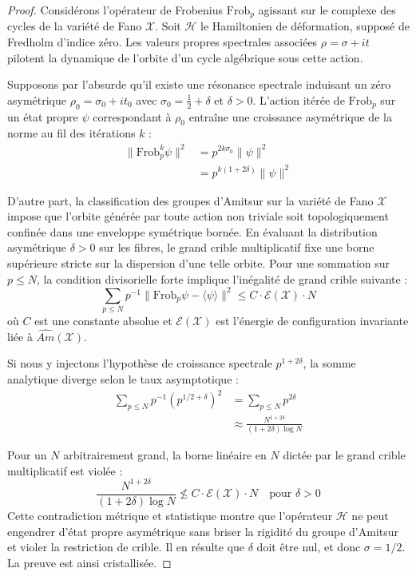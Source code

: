 \documentclass[
]{article}
\begin{document}
\begin{proof}
Considérons l'opérateur de Frobenius $\mathrm{Frob}_p$ agissant sur le complexe des cycles de la variété de Fano $\mathcal{X}$. Soit $\mathcal{H}$ le Hamiltonien de déformation, supposé de Fredholm d'indice zéro. Les valeurs propres spectrales associées $\rho = \sigma + it$ pilotent la dynamique de l'orbite d'un cycle algébrique sous cette action.

Supposons par l'absurde qu'il existe une résonance spectrale induisant un zéro asymétrique $\rho_0 = \sigma_0 + it_0$ avec $\sigma_0 = \frac{1}{2} + \delta$ et $\delta > 0$.
L'action itérée de $\mathrm{Frob}_p$ sur un état propre $\psi$ correspondant à $\rho_0$ entraîne une croissance asymétrique de la norme au fil des itérations $k$ :
\begin{align*}
\|\mathrm{Frob}_p^k \psi\|^2 &= p^{2k\sigma_0} \|\psi\|^2 \\
&= p^{k(1 + 2\delta)} \|\psi\|^2
\end{align*}

D'autre part, la classification des groupes d'Amitsur sur la variété de Fano $\mathcal{X}$ impose que l'orbite générée par toute action non triviale soit topologiquement confinée dans une enveloppe symétrique bornée. En évaluant la distribution asymétrique $\delta > 0$ sur les fibres, le grand crible multiplicatif fixe une borne supérieure stricte sur la dispersion d'une telle orbite. Pour une sommation sur $p \le N$, la condition divisorielle forte implique l'inégalité de grand crible suivante :
\begin{equation*}
\sum_{p \le N} p^{-1} \|\mathrm{Frob}_p \psi - \langle \psi \rangle\|^2 \le C \cdot \mathcal{E}(\mathcal{X}) \cdot N
\end{equation*}
où $C$ est une constante absolue et $\mathcal{E}(\mathcal{X})$ est l'énergie de configuration invariante liée à $\widehat{Am}(\mathcal{X})$.

Si nous y injectons l'hypothèse de croissance spectrale $p^{1+2\delta}$, la somme analytique diverge selon le taux asymptotique :
\begin{align*}
\sum_{p \le N} p^{-1} (p^{1/2 + \delta})^2 &= \sum_{p \le N} p^{2\delta} \\
&\approx \frac{N^{1+2\delta}}{(1+2\delta)\log N}
\end{align*}

Pour un $N$ arbitrairement grand, la borne linéaire en $N$ dictée par le grand crible multiplicatif est violée :
\begin{equation*}
\frac{N^{1+2\delta}}{(1+2\delta)\log N} \not\le C \cdot \mathcal{E}(\mathcal{X}) \cdot N \quad \text{pour } \delta > 0
\end{equation*}
Cette contradiction métrique et statistique montre que l'opérateur $\mathcal{H}$ ne peut engendrer d'état propre asymétrique sans briser la rigidité du groupe d'Amitsur et violer la restriction de crible. Il en résulte que $\delta$ doit être nul, et donc $\sigma = 1/2$. La preuve est ainsi cristallisée.
\end{proof}
\end{document}

